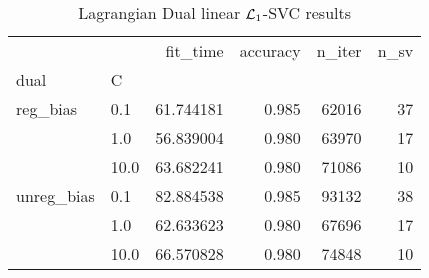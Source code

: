 \begin{table}[H]
\centering
\caption{Lagrangian Dual linear $\protect \mathcal{L}_1$-SVC results}
\label{linear_lagrangian_dual_l1_svc_cv_results}
\begin{tabular}{llrrrr}
\toprule
           &      &   fit\_time &  accuracy &  n\_iter &  n\_sv \\
dual & C &            &           &         &       \\
\midrule
reg\_bias & 0.1  &  61.744181 &     0.985 &   62016 &    37 \\
           & 1.0  &  56.839004 &     0.980 &   63970 &    17 \\
           & 10.0 &  63.682241 &     0.980 &   71086 &    10 \\
unreg\_bias & 0.1  &  82.884538 &     0.985 &   93132 &    38 \\
           & 1.0  &  62.633623 &     0.980 &   67696 &    17 \\
           & 10.0 &  66.570828 &     0.980 &   74848 &    10 \\
\bottomrule
\end{tabular}
\end{table}
